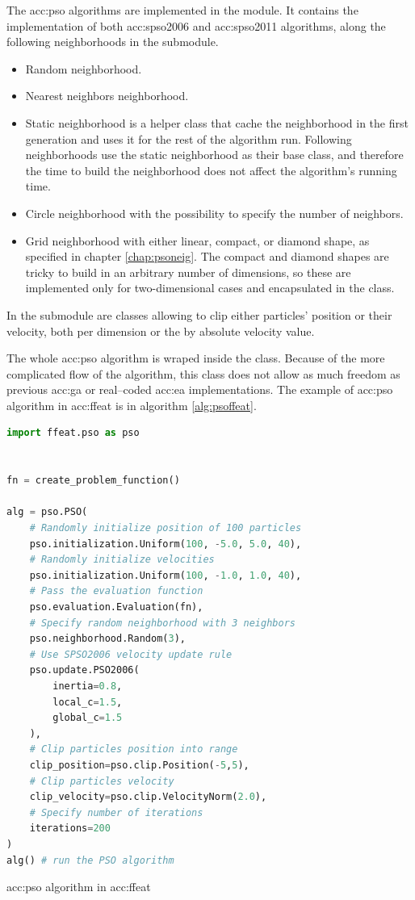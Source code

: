 The \acrlong{acc:pso} algorithms are implemented in the  module. It contains the implementation of both \acrshort{acc:spso2006} and \acrshort{acc:spso2011} algorithms, along the following neighborhoods in the  submodule.
\begin{itemize}
    \item Random neighborhood.
    \item Nearest neighbors neighborhood.
    \item Static neighborhood is a helper class that cache the neighborhood in the first generation and uses it for the rest of the algorithm run. Following neighborhoods use the static neighborhood as their base class, and therefore the time to build the neighborhood does not affect the algorithm's running time.
    \item Circle neighborhood with the possibility to specify the number of neighbors.
    \item Grid neighborhood with either linear, compact, or diamond shape, as specified in chapter \ref{chap:psoneig}. The compact and diamond shapes are tricky to build in an arbitrary number of dimensions, so these are implemented only for two-dimensional cases and encapsulated in the  class.
\end{itemize}

In the  submodule are classes allowing to clip either particles' position or their velocity, both per dimension or the by absolute velocity value.

The whole \acrshort{acc:pso} algorithm is wraped inside the  class. Because of the more complicated flow of the algorithm, this class does not allow as much freedom as previous \acrshort{acc:ga} or real--coded \acrshort{acc:ea} implementations. The example of \acrshort{acc:pso} algorithm in \acrshort{acc:ffeat} is in algorithm \ref{alg:psoffeat}.

\begin{algorithm}[b!]
\begin{lstlisting}[language=Python, xrightmargin=18pt]
import ffeat.pso as pso


fn = create_problem_function()

alg = pso.PSO(
    # Randomly initialize position of 100 particles
    pso.initialization.Uniform(100, -5.0, 5.0, 40),
    # Randomly initialize velocities
    pso.initialization.Uniform(100, -1.0, 1.0, 40),
    # Pass the evaluation function
    pso.evaluation.Evaluation(fn),
    # Specify random neighborhood with 3 neighbors
    pso.neighborhood.Random(3),
    # Use SPSO2006 velocity update rule
    pso.update.PSO2006(
        inertia=0.8, 
        local_c=1.5, 
        global_c=1.5
    ),
    # Clip particles position into range
    clip_position=pso.clip.Position(-5,5),
    # Clip particles velocity
    clip_velocity=pso.clip.VelocityNorm(2.0),
    # Specify number of iterations
    iterations=200
)
alg() # run the PSO algorithm
\end{lstlisting}
\caption{\acrshort*{acc:pso} algorithm in \acrshort*{acc:ffeat}}
\label{alg:psoffeat}
\end{algorithm}
